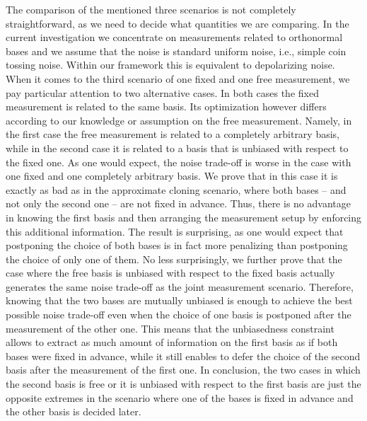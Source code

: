 \documentclass[12pt,reqno]{amsart}
\theoremstyle{definition}
\begin{document}
The comparison of the mentioned three scenarios is not completely straightforward, as we need to decide what quantities we are comparing.
In the current investigation we concentrate on measurements related to orthonormal bases and we assume that the noise is standard uniform noise, i.e., simple coin tossing noise. Within our framework this is equivalent to depolarizing noise. 
When it comes to the third scenario of one fixed and one free measurement, we pay particular attention to two alternative cases. In both cases the fixed measurement is related to the same basis. Its optimization however differs according to our knowledge or assumption on the free measurement. Namely, in the first case the free measurement is related to a completely arbitrary basis, while in the second case it is related to a basis that is unbiased with respect to the fixed one.
As one would expect, the noise trade-off is worse in the case with one fixed and one completely arbitrary basis. 
We prove that in this case it is exactly as bad as in the approximate cloning scenario, where both bases -- and not only the second one -- are not fixed in advance. Thus, there is no advantage in knowing the first basis and then arranging the measurement setup by enforcing this additional information. The result is surprising, as one would expect that postponing the choice of both bases is in fact more penalizing than postponing the choice of only one of them. No less surprisingly, we further prove that the case where the free basis is unbiased with respect to the fixed basis actually generates the same noise trade-off as the joint measurement scenario. Therefore, knowing that the two bases are mutually unbiased is enough to achieve the best possible noise trade-off even when the choice of one basis is postponed after the measurement of the other one. This means that the unbiasedness constraint allows to extract as much amount of information on the first basis as if both bases were fixed in advance, while it still enables to defer the choice of the second basis after the measurement of the first one. In conclusion, the two cases in which the second basis is free or it is unbiased with respect to the first basis are just the opposite extremes in the scenario where one of the bases is fixed in advance and the other basis is decided later.
\end{document}
